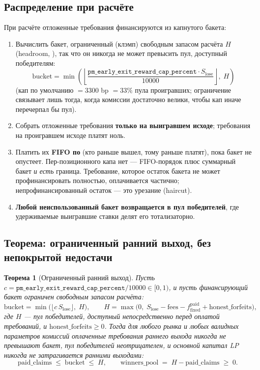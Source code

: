 \documentclass{ledger}
\theoremstyle{plain}
\newtheorem{theorem}{Теорема}
\theoremstyle{remark}
\begin{document}
\subsection{Распределение при расчёте}\label{sec:defsettle}

При расчёте отложенные требования финансируются из капнутого бакета:

\begin{enumerate}
  \item Вычислить бакет, ограниченный (клэмп) свободным запасом расчёта $H$
  (headroom, ), так что он никогда не может превысить пул,
  доступный победителям:
  \[
  \text{bucket} = \min\!\left(\left\lfloor
  \frac{\texttt{pm\_early\_exit\_reward\_cap\_percent} \cdot S_{\text{lose}}}{10000}
  \right\rfloor,\; H\right)
  \]
  (кап по умолчанию $=3300$ bp $=33\%$ пула проигравших; ограничение связывает лишь
  тогда, когда комиссии достаточно велики, чтобы кап иначе перечерпал бы пул).
  \item Собрать отложенные требования \textbf{только на выигравшем исходе};
  требования на проигравшем исходе платят ноль.
  \item Платить их \textbf{FIFO по } (кто раньше вышел, тому раньше
  платят), пока бакет не опустеет. Пер-позиционного капа нет --- FIFO-порядок плюс
  суммарный бакет \emph{и есть} граница. Требование, которое остаток бакета не может
  профинансировать полностью, оплачивается частично; непрофинансированный остаток ---
  это урезание (haircut).
  \item \textbf{Любой неиспользованный бакет возвращается в пул победителей}, где
  удерживаемые выигравшие ставки делят его тотализаторно.
\end{enumerate}

\subsection{Теорема: ограниченный ранний выход, без непокрытой недостачи}\label{sec:defthm}

\begin{theorem}[Ограниченный ранний выход]\label{thm:earlyexit}
Пусть $c = \texttt{pm\_early\_exit\_reward\_cap\_percent}/10000 \in [0,1)$, и пусть
финансирующий бакет ограничен свободным запасом расчёта:
\[
\text{bucket} = \min\!\big(\lfloor c\, S_{\text{lose}}\rfloor,\; H\big), \qquad
H = \max\!\big(0,\; S_{\text{lose}} - \text{fees} - f_{\text{fixed}}^{\text{paid}}
+ \text{honest\_forfeits}\big),
\]
где $H$ --- пул победителей, доступный непосредственно \emph{перед} оплатой
требований, и $\text{honest\_forfeits} \ge 0$. Тогда для \emph{любого} рынка и
\emph{любых} валидных параметров комиссий оплаченные требования раннего выхода
никогда не превышают бакет, пул победителей неотрицателен, и основной капитал LP
никогда не затрагивается ранними выходами:
\[
\text{paid\_claims} \;\le\; \text{bucket} \;\le\; H, \qquad
\text{winners\_pool} \;=\; H - \text{paid\_claims} \;\ge\; 0.
\]
\end{theorem}
\end{document}
